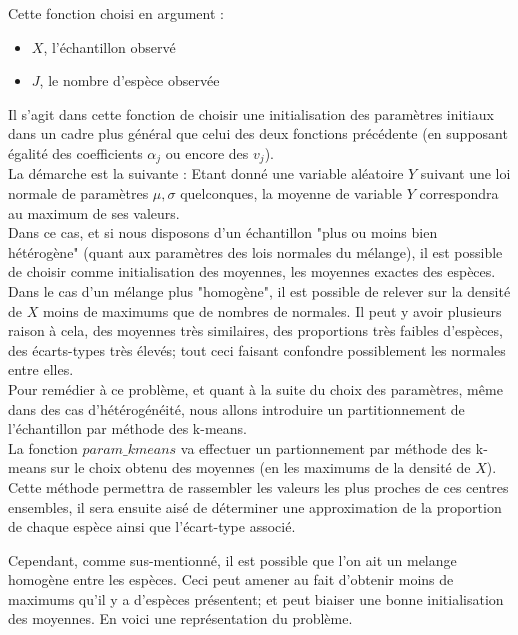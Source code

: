 \documentclass[frenchb]{report}
\newcommand{\1}{\mathbbm{1}}
\theoremstyle{definition}\newtheorem{defn}{Définition}
\theoremstyle{definition}\newtheorem{exm}{Exemple}
\theoremstyle{definition}\newtheorem{nota}{Notation}
\theoremstyle{definition}\newtheorem{rem}{Remarque}
\begin{document}
Cette fonction choisi en argument : 
\begin{itemize}
	\item $X$, l'échantillon observé
	\item $J$, le nombre d'espèce observée\\
\end{itemize}

Il s'agit dans cette fonction de choisir une initialisation des paramètres initiaux dans un cadre plus général que celui des deux fonctions précédente (en supposant égalité des coefficients $\alpha_j$ ou encore des $v_j$). \\

La démarche est la suivante : \newline
Etant donné une variable aléatoire $Y$ suivant une loi normale de paramètres $\mu, \sigma$ quelconques, la moyenne de variable $Y$ correspondra au maximum de ses valeurs. \\
Dans ce cas, et si nous disposons d'un échantillon "plus ou moins bien hétérogène" (quant aux paramètres des lois normales du mélange), il est possible de choisir comme initialisation des moyennes, les moyennes exactes des espèces. 
Dans le cas d'un mélange plus "homogène", il est possible de relever sur la densité de $X$ moins de maximums que de nombres de normales. Il peut y avoir plusieurs raison à cela, des moyennes très similaires, des proportions très faibles d'espèces, des écarts-types très élevés; tout ceci faisant confondre possiblement les normales entre elles. \\

Pour remédier à ce problème, et quant à la suite du choix des paramètres, même dans des cas d'hétérogénéité, nous allons introduire un partitionnement de l'échantillon par méthode des k-means.\\

La fonction $param\_kmeans$ va effectuer un partionnement par méthode des k-means sur le choix obtenu des moyennes (en les maximums de la densité de $X$). 
Cette méthode permettra de rassembler les valeurs les plus proches de ces centres ensembles, il sera ensuite aisé de déterminer une approximation de la proportion de chaque espèce ainsi que l'écart-type associé.

Cependant, comme sus-mentionné, il est possible que l'on ait un melange homogène entre les espèces. Ceci peut amener au fait d'obtenir moins de maximums qu'il y a d'espèces présentent; et peut biaiser une bonne initialisation des moyennes. En voici une représentation du problème.
\end{document}
